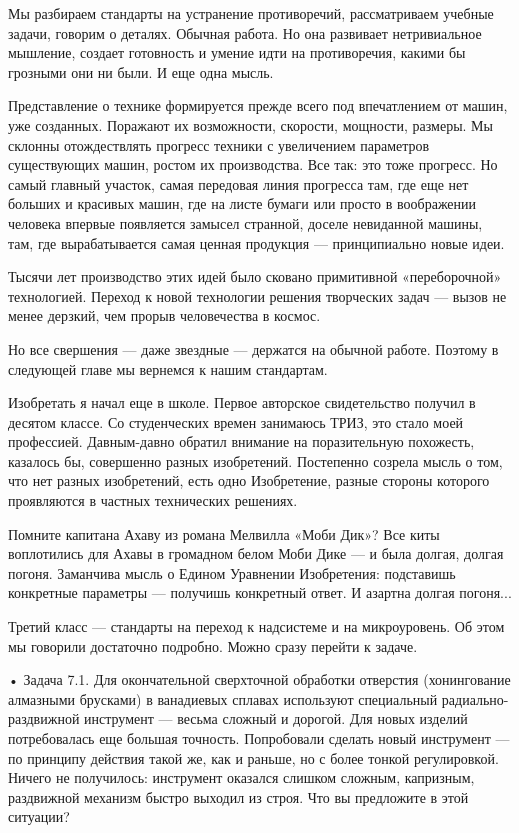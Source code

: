 Мы  разбираем  стандарты  на  устранение  противоречий,  рассматриваем
учебные задачи,  говорим о деталях.  Обычная работа. Но  она развивает
нетривиальное   мышление,  создает   готовность  и   умение  идти   на
противоречия, какими бы грозными они ни были. И еще одна мысль.

Представление о  технике формируется прежде всего  под впечатлением от
машин,  уже созданных.  Поражают их  возможности, скорости,  мощности,
размеры.  Мы  склонны  отождествлять прогресс  техники  с  увеличением
параметров существующих  машин, ростом  их производства. Все  так: это
тоже  прогресс.  Но  самый  главный  участок,  самая  передовая  линия
прогресса там,  где еще  нет больших  и красивых  машин, где  на листе
бумаги или  просто в  воображении человека впервые  появляется замысел
странной,  доселе невиданной  машины,  там,  где вырабатывается  самая
ценная продукция — принципиально новые идеи.

Тысячи   лет  производство   этих   идей   было  сковано   примитивной
«переборочной»  технологией.   Переход  к  новой   технологии  решения
творческих задач —  вызов не менее дерзкий, чем  прорыв человечества в
космос.

Но все свершения — даже звездные — держатся на обычной работе. Поэтому
в следующей главе мы вернемся к нашим стандартам.





Изобретать  я  начал  еще  в  школе.  Первое  авторское  свидетельство
получил в десятом  классе. Со студенческих времен  занимаюсь ТРИЗ, это
стало моей профессией. Давным-давно  обратил внимание на поразительную
похожесть,  казалось  бы,  совершенно разных  изобретений.  Постепенно
созрела  мысль   о  том,  что   нет  разных  изобретений,   есть  одно
Изобретение, разные стороны которого проявляются в частных технических
решениях.

Помните  капитана  Ахаву  из  романа Мелвилла  «Моби  Дик»?  Все  киты
воплотились для  Ахавы в громадном  белом Моби  Дике — и  была долгая,
долгая  погоня.  Заманчива  мысль   о  Едином  Уравнении  Изобретения:
подставишь конкретные параметры — получишь конкретный ответ. И азартна
долгая погоня...


Третий класс — стандарты на переход к надсистеме и на микроуровень. Об
этом мы говорили достаточно подробно. Можно сразу перейти к задаче.


•  Задача  7.1.  Для  окончательной  сверхточной  обработки  отверстия
(хонингование  алмазными  брусками)  в ванадиевых  сплавах  используют
специальный  радиально-раздвижной   инструмент  —  весьма   сложный  и
дорогой.  Для  новых  изделий   потребовалась  еще  большая  точность.
Попробовали сделать новый инструмент —  по принципу действия такой же,
как и  раньше, но с  более тонкой регулировкой. Ничего  не получилось:
инструмент  оказался слишком  сложным, капризным,  раздвижной механизм
быстро выходил из строя. Что вы предложите в этой ситуации?

